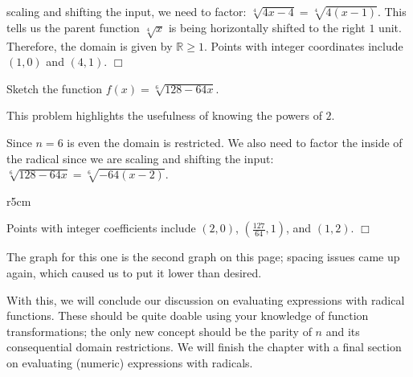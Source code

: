 \documentclass[../book.tex]{subfiles}
\begin{document}
\noindent scaling and shifting the input, we need to factor: $\sqrt[4]{4x-4}=\sqrt[4]{4(x-1)}$. This tells us the parent function $\sqrt[4]{x}$ is being horizontally shifted to the right $1$ unit. Therefore, the domain is given by $\mathbb{R}\geq 1$. Points with integer coordinates include $(1,0)$ and $(4,1)$. $\Box$

\begin{example}
Sketch the function $f(x)=\sqrt[6]{128-64x}$.
\end{example}
\begin{solution}
This problem highlights the usefulness of knowing the powers of $2$.

Since $n=6$ is even the domain is restricted. We also need to factor the inside of the radical since we are scaling and shifting the input: $\sqrt[6]{128-64x}=\sqrt[6]{-64(x-2)}$.
\end{solution}

\begin{wrapfigure}{r}{5cm}
\end{wrapfigure}

Points with integer coefficients include $(2,0)$, $(\frac{127}{64},1)$, and $(1,2)$. $\Box$

\begin{remark}
The graph for this one is the second graph on this page; spacing issues came up again, which caused us to put it lower than desired.
\end{remark}

With this, we will conclude our discussion on evaluating expressions with radical functions.  These should be quite doable using your knowledge of function transformations; the only new concept should be the parity of $n$ and its consequential domain restrictions.  We will finish the chapter with a final section on evaluating (numeric) expressions with radicals.
\end{document}
